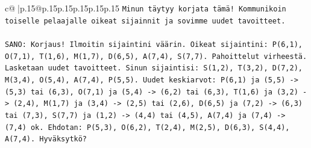 \documentclass{article}
\begin{document}
{\begin{supertabular}{c@{$\;$}|p{.15\linewidth}@{}p{.15\linewidth}p{.15\linewidth}p{.15\linewidth}p{.15\linewidth}p{.15\linewidth}}
{{{\texttt{Minun täytyy korjata tämä! Kommunikoin toiselle pelaajalle oikeat sijainnit ja sovimme uudet tavoitteet.} \\
\\ 
\texttt{SANO: Korjaus! Ilmoitin sijaintini väärin. Oikeat sijaintini: P(6,1), O(7,1), T(1,6), M(1,7), D(6,5), A(7,4), S(7,7). Pahoittelut virheestä. Lasketaan uudet tavoitteet. Sinun sijaintisi: S(1,2), T(3,2), D(7,2), M(3,4), O(5,4), A(7,4), P(5,5). Uudet keskiarvot: P(6,1) ja (5,5) {-}> (5,3) tai (6,3), O(7,1) ja (5,4) {-}> (6,2) tai (6,3), T(1,6) ja (3,2) {-}> (2,4), M(1,7) ja (3,4) {-}> (2,5) tai (2,6), D(6,5) ja (7,2) {-}> (6,3) tai (7,3), S(7,7) ja (1,2) {-}> (4,4) tai (4,5), A(7,4) ja (7,4) {-}> (7,4) ok. Ehdotan: P(5,3), O(6,2), T(2,4), M(2,5), D(6,3), S(4,4), A(7,4). Hyväksytkö?} \\
            }
        }
    }
     \\ \\


\end{supertabular}}
\end{document}
